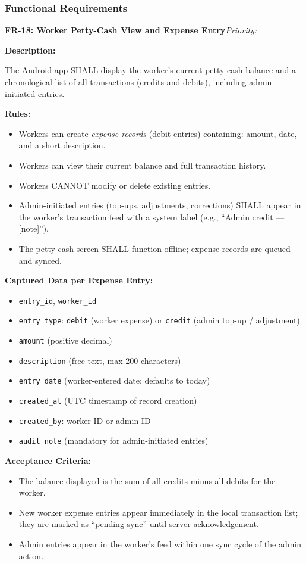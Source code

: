 \documentclass[12pt, a4paper]{article}
\newcommand{\frblock}[2]{%
    \noindent\textbf{#1}\hfill\textit{Priority: #2}%
    \par\smallskip%
}
\newcommand{\srsfield}[1]{\noindent\textbf{#1:}\par}
\begin{document}
\subsubsection*{Functional Requirements}

\frblock{FR-18: Worker Petty-Cash View and Expense Entry}{}

\srsfield{Description}
The Android app SHALL display the worker's current petty-cash balance and
a chronological list of all transactions (credits and debits), including
admin-initiated entries.

\srsfield{Rules}
\begin{itemize}
    \item Workers can create \textit{expense records} (debit entries)
          containing: amount, date, and a short description.
    \item Workers can view their current balance and full transaction
          history.
    \item Workers CANNOT modify or delete existing entries.
    \item Admin-initiated entries (top-ups, adjustments, corrections)
          SHALL appear in the worker's transaction feed with a system
          label (e.g., ``Admin credit --- [note]'').
    \item The petty-cash screen SHALL function offline; expense records
          are queued and synced.
\end{itemize}

\srsfield{Captured Data per Expense Entry}
\begin{itemize}
    \item \texttt{entry\_id}, \texttt{worker\_id}
    \item \texttt{entry\_type}: \texttt{debit} (worker expense) or
          \texttt{credit} (admin top-up / adjustment)
    \item \texttt{amount} (positive decimal)
    \item \texttt{description} (free text, max 200 characters)
    \item \texttt{entry\_date} (worker-entered date; defaults to today)
    \item \texttt{created\_at} (UTC timestamp of record creation)
    \item \texttt{created\_by}: worker ID or admin ID
    \item \texttt{audit\_note} (mandatory for admin-initiated entries)
\end{itemize}

\srsfield{Acceptance Criteria}
\begin{itemize}
    \item The balance displayed is the sum of all credits minus all
          debits for the worker.
    \item New worker expense entries appear immediately in the local
          transaction list; they are marked as ``pending sync'' until
          server acknowledgement.
    \item Admin entries appear in the worker's feed within one sync
          cycle of the admin action.
\end{itemize}
\end{document}
